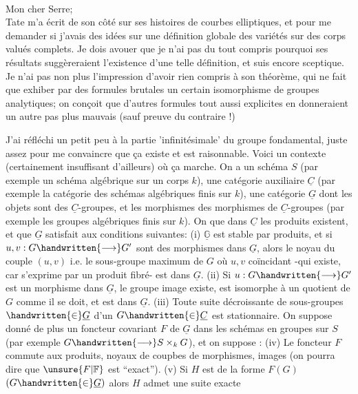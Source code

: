 
\\

Mon cher Serre;\\

Tate m'a écrit de son côté  sur ses histoires de courbes elliptiques, et pour me demander si j'avais des idées sur une définition globale des variétés  sur des corps valués complets. Je dois avouer que je n'ai pas du tout compris pourquoi ses résultats suggèreraient l'existence d'une telle définition, et suis encore sceptique. Je n'ai pas non plus l'impression d'avoir rien compris à son théorème, qui  ne fait que exhiber par des formules brutales un certain isomorphisme de groupes analytiques;  on conçoit que d'autres formules tout aussi explicites en donneraient un autre pas plus mauvais (sauf preuve du contraire !)

J'ai réfléchi un petit peu à la partie 'infinitésimale' du groupe fondamental, juste assez pour me convaincre que ça existe et est raisonnable. Voici un contexte (certainement insuffisant d'ailleurs) où ça marche. On a un schéma $S$ (par exemple un schéma algébrique sur un corps $k$), une catégorie auxiliaire $\underline{C}$ (par exemple la catégorie des schémas algébriques finis sur $k$), une catégorie  $\underline{G}$ dont les objets sont des $\underline{C}$-groupes, et les morphismes des morphismes de $\underline{C}$-groupes (par exemple les groupes algébriques finis sur $k$). On  que dans $\underline{C}$ les produits  existent, et que $\underline{G}$ satisfait aux conditions suivantes: (i) $\underline{\mathbb{G}}$ est stable par produits, et si $u,v:G\handwritten{\longrightarrow}G'$ sont des morphismes dans $\underline{G}$, alors le noyau du couple $(u,v)$ i.e. le sous-groupe  maximum de $G$ où $u,v$ coïncidant -qui existe, car s'exprime par un produit fibré- est dans $\underline{G}$. (ii) Si $u:G\handwritten{\longrightarrow}G'$ est un morphisme dans $\underline{G}$,  le groupe image existe, est isomorphe à un quotient de $G$ comme il se doit, et est dans $\underline{G}$. (iii) Toute suite décroissante de sous-groupes  $\handwritten{\in}\underline{G}$ d'un $G\handwritten{\in}\underline{C}$ est stationnaire. On suppose donné de plus un foncteur covariant  $F$ de $\underline{G}$ dans les  schémas en groupes sur $S$ (par exemple $G\handwritten{\longrightarrow}S\mathbin{\times}_{k}G$), et on suppose : (iv) Le foncteur $F$ commute aux produits,  noyaux de coupbes de morphismes, images (on pourra dire que $\unsure{F|\mathbb{F}}$ est ``exact''). (v) Si $H$ est  de la forme $F(G)$ $(G\handwritten{\in}\underline{G})$ alors $H$ admet une suite exacte
